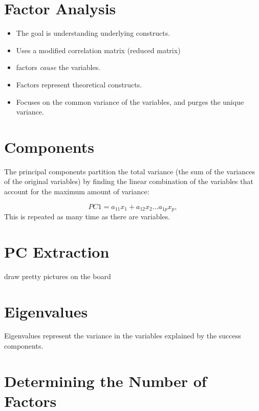 \documentclass[
]{book}
\providecommand{\tightlist}{%
  \setlength{\itemsep}{0pt}\setlength{\parskip}{0pt}}
\begin{document}
\hypertarget{factor-analysis-1}{%
\section{Factor Analysis}\label{factor-analysis-1}}

\begin{itemize}
\tightlist
\item
  The goal is understanding underlying constructs.
\item
  Uses a modified correlation matrix (reduced matrix)
\item
  factors \emph{cause} the variables.
\item
  Factors represent theoretical constructs.
\item
  Focuses on the common variance of the variables, and purges the unique variance.
\end{itemize}

\hypertarget{components}{%
\section{Components}\label{components}}

The principal components partition the total variance (the sum of the variances of the original variables) by finding the linear combination of the variables that account for the maximum amount of variance:

\[
PC1 = a_{11}x_1 + a_{12}x_2 ... a_{1p}x_p, 
\]
This is repeated as many time as there are variables.

\hypertarget{pc-extraction}{%
\section{PC Extraction}\label{pc-extraction}}

draw pretty pictures on the board

\hypertarget{eigenvalues}{%
\section{Eigenvalues}\label{eigenvalues}}

Eigenvalues represent the variance in the variables explained by the success components.

\hypertarget{determining-the-number-of-factors}{%
\section{Determining the Number of Factors}\label{determining-the-number-of-factors}}
\end{document}
